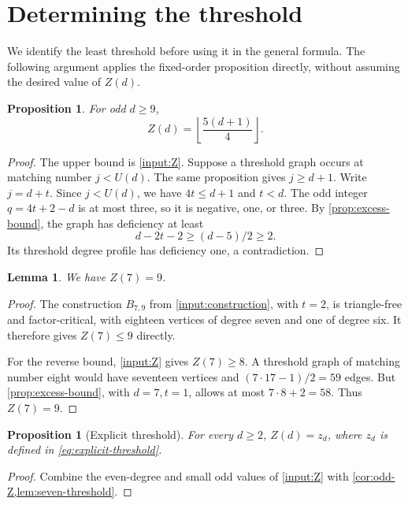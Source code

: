 \documentclass[11pt]{article}
\newtheorem{lemma}[theorem]{Lemma}
\newtheorem{proposition}[theorem]{Proposition}
\theoremstyle{definition}
\theoremstyle{remark}
\newcommand{\floor}[1]{\left\lfloor #1\right\rfloor}
\begin{document}
\section{Determining the threshold}\label{sec:exact-threshold}

We identify the least threshold before using it in the general formula.
The following argument applies the fixed-order proposition directly, without
assuming the desired value of $Z(d)$.

\begin{proposition}\label{cor:odd-Z}
For odd $d\ge9$,
\[
  Z(d)=\floor{\frac{5(d+1)}4}.
\]
\end{proposition}

\begin{proof}
The upper bound is \cref{input:Z}. Suppose a threshold graph occurs at
matching number $j<U(d)$. The same proposition gives $j\ge d+1$.
Write $j=d+t$. Since $j<U(d)$, we have $4t\le d+1$ and $t<d$.
The odd integer $q=4t+2-d$ is at most three, so it is negative, one, or
three. By \cref{prop:excess-bound}, the graph has deficiency at least
\[
  d-2t-2\ge(d-5)/2\ge2.
\]
Its threshold degree profile has deficiency one, a contradiction.
\end{proof}

\begin{lemma}\label{lem:seven-threshold}
We have $Z(7)=9$.
\end{lemma}

\begin{proof}
The construction $B_{7,9}$ from \cref{input:construction}, with $t=2$,
is triangle-free and factor-critical, with eighteen vertices of degree
seven and one of degree six. It therefore gives $Z(7)\le9$ directly.

For the reverse bound, \cref{input:Z} gives $Z(7)\ge8$. A threshold graph
of matching number eight would have seventeen vertices and
$(7\cdot17-1)/2=59$ edges. But \cref{prop:excess-bound}, with $d=7,t=1$,
allows at most $7\cdot8+2=58$. Thus $Z(7)=9$.
\end{proof}

\begin{proposition}[Explicit threshold]\label{prop:explicit-Z}
For every $d\ge2$, $Z(d)=z_d$, where $z_d$ is defined in
\cref{eq:explicit-threshold}.
\end{proposition}

\begin{proof}
Combine the even-degree and small odd values of \cref{input:Z} with
\cref{cor:odd-Z,lem:seven-threshold}.
\end{proof}
\end{document}
